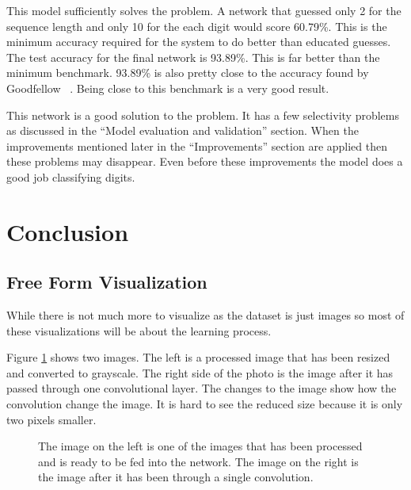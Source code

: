 \documentclass[12pt,twocolumn,letterpaper]{article}
\begin{document}
This model sufficiently solves the problem. A network that guessed only 2 for the 
sequence length and only 10 for the each digit would score 60.79\%. This is the 
minimum accuracy required for the system to do better than educated guesses. The
test accuracy for the final network is 93.89\%. This is far better than the 
minimum benchmark. 93.89\% is also pretty close to the accuracy found by Goodfellow
\etal ~\cite{goodfellow}. Being close to this benchmark is a very good result.

This network is a good solution to the problem. It has a few selectivity problems 
as discussed in the ``Model evaluation and validation'' section. When the 
improvements mentioned later in the ``Improvements'' section are applied then 
these problems may disappear. Even before these improvements the model does a 
good job classifying digits.

\section{Conclusion}
\subsection{Free Form Visualization}
While there is not much more to visualize as the dataset is just images so most 
of these visualizations will be about the learning process.

Figure \ref{fig:two image} shows two images. The left is a processed image that has been resized 
and converted to grayscale. The right side of the photo is the image after it 
has passed through one convolutional layer. The changes to the image show how the 
convolution change the image. It is hard to see the reduced size because it is 
only two pixels smaller.

\begin{figure}[t]
\begin{center}
\end{center}
   \caption{The image on the left is one of the images that has been processed 
   and is ready to be fed into the network. The image on the right is the image
   after it has been through a single convolution.}
\label{fig:two image}
\end{figure}
\end{document}
